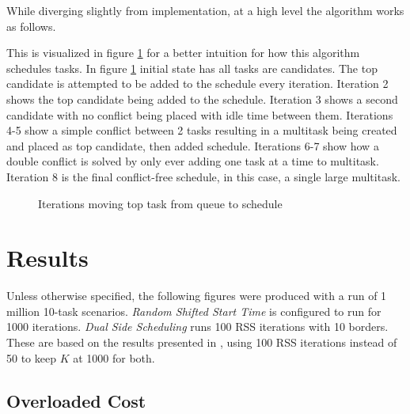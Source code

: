\documentclass[conference]{IEEEtran}
\begin{document}
While diverging slightly from implementation, at a high level the algorithm works as follows.

\begin{algorithmic}[1]
	\ELSE
	\ENDIF
	\ENDWHILE
\end{algorithmic}

This is visualized in figure \ref{fig:animation} for a better intuition for how this algorithm schedules tasks.
In figure \ref{fig:animation} initial state has all tasks are candidates.
The top candidate is attempted to be added to the schedule every iteration.
Iteration 2 shows the top candidate being added to the schedule.
Iteration 3 shows a second candidate with no conflict being placed with idle time between them.
Iterations 4-5 show a simple conflict between 2 tasks resulting in a multitask being created and placed as top candidate, then added schedule.
Iterations 6-7 show how a double conflict is solved by only ever adding one task at a time to multitask.
Iteration 8 is the final conflict-free schedule, in this case, a single large multitask.

\begin{figure}
	\centering
	{}
	\caption{Iterations moving top task from queue to schedule}
	\label{fig:animation}
\end{figure}
\section{Results}

Unless otherwise specified, the following figures were produced with a run of 1 million 10-task scenarios.
\emph{Random Shifted Start Time} is configured to run for 1000 iterations.
\emph{Dual Side Scheduling} runs 100 RSS iterations with 10 borders.
These are based on the results presented in \cite{dss_2020}, using 100 RSS iterations instead of 50 to keep $K$ at 1000 for both.

\subsection{Overloaded Cost}
\end{document}
